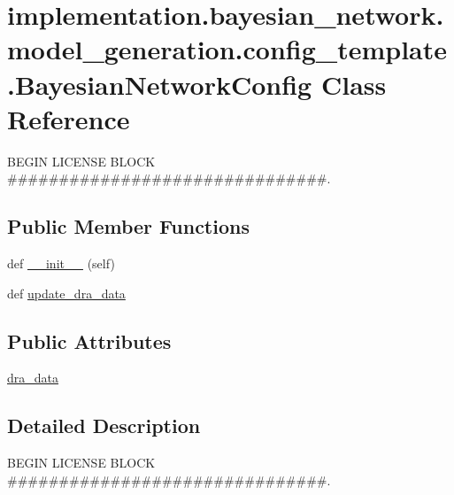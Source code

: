 \hypertarget{classimplementation_1_1bayesian__network_1_1model__generation_1_1config__template_1_1_bayesian_network_config}{}\section{implementation.\+bayesian\+\_\+network.\+model\+\_\+generation.\+config\+\_\+template.\+Bayesian\+Network\+Config Class Reference}
\label{classimplementation_1_1bayesian__network_1_1model__generation_1_1config__template_1_1_bayesian_network_config}


B\+E\+G\+IN L\+I\+C\+E\+N\+SE B\+L\+O\+CK \#\#\#\#\#\#\#\#\#\#\#\#\#\#\#\#\#\#\#\#\#\#\#\#\#\#\#\#\#\#\#.  


\subsection*{Public Member Functions}
\begin{DoxyCompactItemize}
\item 
def \hyperlink{classimplementation_1_1bayesian__network_1_1model__generation_1_1config__template_1_1_bayesian_network_config_a5948c394ba185cb5e0565e551e0045b9}{\+\_\+\+\_\+init\+\_\+\+\_\+} (self)
\item 
def \hyperlink{classimplementation_1_1bayesian__network_1_1model__generation_1_1config__template_1_1_bayesian_network_config_a1d9ebc7144cc59cac168d6b2f360b7df}{update\+\_\+dra\+\_\+data}
\end{DoxyCompactItemize}
\subsection*{Public Attributes}
\begin{DoxyCompactItemize}
\item 
\hyperlink{classimplementation_1_1bayesian__network_1_1model__generation_1_1config__template_1_1_bayesian_network_config_ae3c593ce1d24a9472bab06a72ff0c70f}{dra\+\_\+data}
\end{DoxyCompactItemize}


\subsection{Detailed Description}
B\+E\+G\+IN L\+I\+C\+E\+N\+SE B\+L\+O\+CK \#\#\#\#\#\#\#\#\#\#\#\#\#\#\#\#\#\#\#\#\#\#\#\#\#\#\#\#\#\#\#. 

